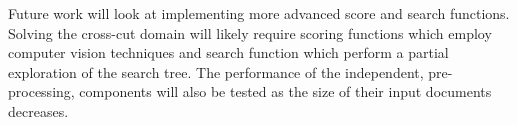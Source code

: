 \documentclass[letterpaper]{article}
\begin{document}
Future work will look at implementing more advanced score and search functions. Solving the cross-cut domain will likely require scoring functions which employ computer vision techniques and search function which perform a partial exploration of the search tree. The performance of the independent, pre-processing, components will also be tested as the size of their input documents decreases.



\end{document}
